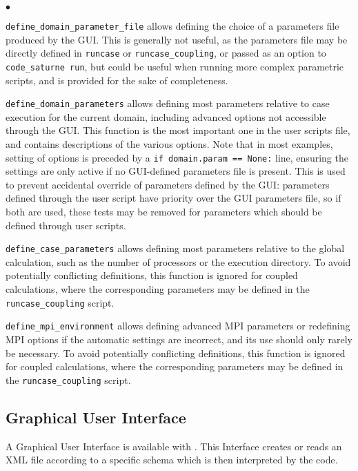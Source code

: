{{{{\begin{list}{$\bullet$}{}
\item \texttt{define\_domain\_parameter\_file} allows defining
 the choice of a parameters file produced by the GUI. This is
 generally not useful, as the parameters file may be directly
 defined in \texttt{runcase} or \texttt{runcase\_coupling}, or passed
 as an option to \texttt{code\_saturne run}, but could be useful
 when running more complex parametric scripts, and is provided for
 the sake of completeness.
\item \texttt{define\_domain\_parameters} allows defining
 most parameters relative to case execution for the current
 domain, including advanced options not accessible
 through the GUI. This function is the most important one in the user
 scripts file, and contains descriptions of the various options.
 Note that in most examples, setting of options is preceded by
 a \texttt{if domain.param == None:} line, ensuring the settings
 are only active if no GUI-defined parameters file is present.
 This is used to prevent accidental override of parameters defined
 by the GUI: parameters defined through the user script have priority
 over the GUI parameters file, so if both are used, these tests
 may be removed for parameters which should be defined through
 user scripts.
\item \texttt{define\_case\_parameters} allows defining
 most parameters relative to the global calculation, such as
 the number of processors or the execution directory.
 To avoid potentially conflicting definitions, this function is ignored
 for coupled calculations, where the corresponding parameters
 may be defined in the \texttt{runcase\_coupling} script.
\item \texttt{define\_mpi\_environment} allows defining
 advanced MPI parameters or redefining MPI options if the automatic
 settings are incorrect, and its use should only rarely be necessary.
 To avoid potentially conflicting definitions, this function is ignored
 for coupled calculations, where the corresponding parameters
 may be defined in the \texttt{runcase\_coupling} script.
\end{list}

\subsection{Graphical User Interface}
\label{sec:prg_gui}%
A Graphical User Interface is available with \CS.
This Interface creates or reads an XML file according to
a specific \CS schema which is then interpreted by the code.

}}}}
